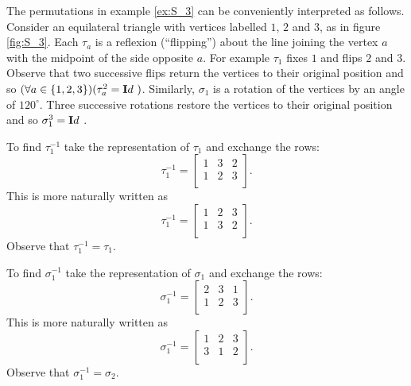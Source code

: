 The permutations in example \ref{ex:S_3} can be conveniently
interpreted as follows. Consider an equilateral triangle with
vertices labelled $1$, $2$ and $3$, as in figure \ref{fig:S_3}.
Each $\tau_a$ is a reflexion (``flipping'') about the line joining
the vertex $a$ with the midpoint of the side opposite $a$. For
example $\tau_1$ fixes $1$ and flips $2$ and $3$. Observe that two
successive flips return the vertices to their original position
and so $(\forall a\in\{1, 2, 3\})(\tau_a ^2 = {\mathbf Id\ })$.
Similarly, $\sigma_1$ is a rotation of the vertices by an angle of
$120^\circ$. Three successive rotations restore the vertices to
their original position and so $\sigma_1 ^3 = {\mathbf Id\ }$.


\begin{exa}
To find $\tau_1^{-1}$ take the representation of $\tau_1$ and
exchange the rows:
$$ \tau_1^{-1}  = \begin{bmatrix}1 & 3 & 2 \\  1 & 2 & 3 \\  \end{bmatrix}.$$
This is more naturally written as
$$ \tau_1^{-1}  = \begin{bmatrix}1 & 2 & 3 \\  1 & 3 & 2 \\  \end{bmatrix}.$$
Observe that $\tau_1^{-1} = \tau _1$.
\end{exa}
\begin{exa}
To find $\sigma_1^{-1}$ take the representation of $\sigma_1$ and
exchange the rows:
$$ \sigma_1^{-1}  = \begin{bmatrix}2 & 3 & 1 \\  1 & 2 & 3 \\  \end{bmatrix}.$$
This is more naturally written as
$$ \sigma_1^{-1}  = \begin{bmatrix}1 & 2 & 3 \\  3 & 1 & 2 \\  \end{bmatrix}.$$
Observe that $\sigma_1^{-1} = \sigma_2$.
\end{exa}




